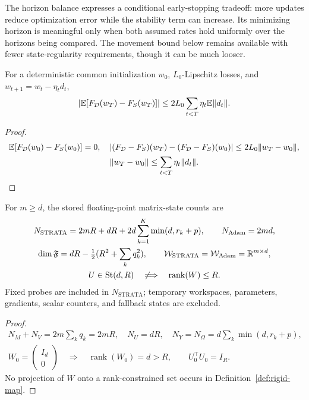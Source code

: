 The horizon balance expresses a conditional early-stopping tradeoff: more
updates reduce optimization error while the stability term can increase.
Its minimizing horizon is meaningful only when both assumed rates hold
uniformly over the horizons being compared. The movement bound below remains
available with fewer state-regularity requirements, though it can be much looser.

\begin{proposition}\label{prop:tf-movement}
For a deterministic common initialization $w_0$, $L_0$-Lipschitz losses, and
$w_{t+1}=w_t-\eta_td_t$,
\begin{equation}
 \left|\mathbb E[F_\mathcal D(w_T)-F_S(w_T)]\right|
 \le2L_0\sum_{t<T}\eta_t\mathbb E\|d_t\|.
\end{equation}
\end{proposition}
\begin{proof}
\begin{gather}
 \mathbb E[F_\mathcal D(w_0)-F_S(w_0)]=0,\quad
 |(F_\mathcal D-F_S)(w_T)-(F_\mathcal D-F_S)(w_0)|\le2L_0\|w_T-w_0\|,\\
 \|w_T-w_0\|\le\sum_{t<T}\eta_t\|d_t\|.
\end{gather}
\end{proof}
\begin{proposition}\label{prop:rigid-domain}
For $m\ge d$, the stored floating-point matrix-state counts are
\begin{gather}
 N_{\mathrm{STRATA}}=2mR+dR+2d\sum_{k=1}^K\min(d,r_k+p),\qquad
 N_{\mathrm{Adam}}=2md,\\
 \dim\mathfrak F=dR-\tfrac12(R^2+\sum_kq_k^2),\qquad
 \mathcal W_{\mathrm{STRATA}}=\mathcal W_{\mathrm{Adam}}=\mathbb R^{m\times d},\\
 U\in\operatorname{St}(d,R)\quad\not\Longrightarrow\quad \operatorname{rank}(W)\le R.
\end{gather}
Fixed probes are included in $N_{\mathrm{STRATA}}$; temporary workspaces,
parameters, gradients, scalar counters, and fallback states are excluded.
\end{proposition}
\begin{proof}
\begin{gather}
 N_M+N_V=2m\sum_kq_k=2mR,\quad N_U=dR,\quad
 N_Y=N_\Omega=d\sum_k\min(d,r_k+p),\\
 W_0=\begin{pmatrix}I_d\\0\end{pmatrix}\quad\Longrightarrow\quad
 \operatorname{rank}(W_0)=d>R,\qquad U_0^\top U_0=I_R.
\end{gather}
No projection of $W$ onto a rank-constrained set occurs in
Definition~\ref{def:rigid-map}.
\end{proof}
